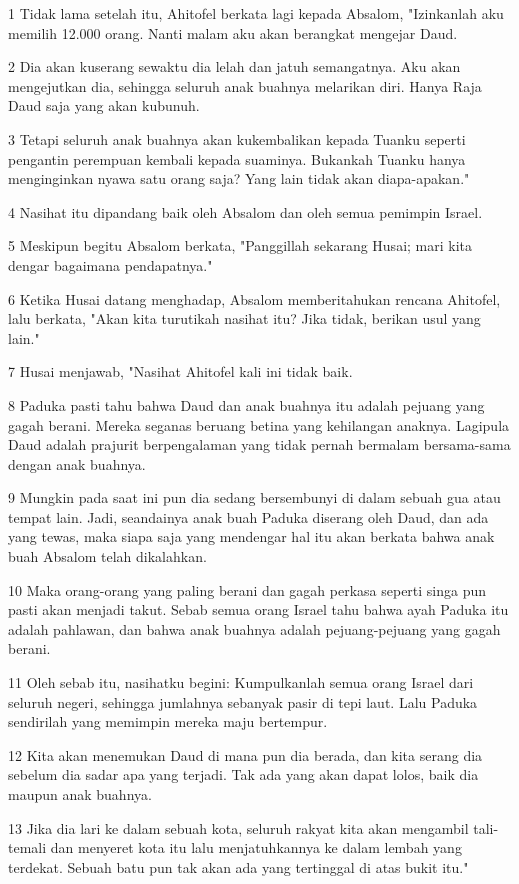 \par 1 Tidak lama setelah itu, Ahitofel berkata lagi kepada Absalom, "Izinkanlah aku memilih 12.000 orang. Nanti malam aku akan berangkat mengejar Daud.
\par 2 Dia akan kuserang sewaktu dia lelah dan jatuh semangatnya. Aku akan mengejutkan dia, sehingga seluruh anak buahnya melarikan diri. Hanya Raja Daud saja yang akan kubunuh.
\par 3 Tetapi seluruh anak buahnya akan kukembalikan kepada Tuanku seperti pengantin perempuan kembali kepada suaminya. Bukankah Tuanku hanya menginginkan nyawa satu orang saja? Yang lain tidak akan diapa-apakan."
\par 4 Nasihat itu dipandang baik oleh Absalom dan oleh semua pemimpin Israel.
\par 5 Meskipun begitu Absalom berkata, "Panggillah sekarang Husai; mari kita dengar bagaimana pendapatnya."
\par 6 Ketika Husai datang menghadap, Absalom memberitahukan rencana Ahitofel, lalu berkata, "Akan kita turutikah nasihat itu? Jika tidak, berikan usul yang lain."
\par 7 Husai menjawab, "Nasihat Ahitofel kali ini tidak baik.
\par 8 Paduka pasti tahu bahwa Daud dan anak buahnya itu adalah pejuang yang gagah berani. Mereka seganas beruang betina yang kehilangan anaknya. Lagipula Daud adalah prajurit berpengalaman yang tidak pernah bermalam bersama-sama dengan anak buahnya.
\par 9 Mungkin pada saat ini pun dia sedang bersembunyi di dalam sebuah gua atau tempat lain. Jadi, seandainya anak buah Paduka diserang oleh Daud, dan ada yang tewas, maka siapa saja yang mendengar hal itu akan berkata bahwa anak buah Absalom telah dikalahkan.
\par 10 Maka orang-orang yang paling berani dan gagah perkasa seperti singa pun pasti akan menjadi takut. Sebab semua orang Israel tahu bahwa ayah Paduka itu adalah pahlawan, dan bahwa anak buahnya adalah pejuang-pejuang yang gagah berani.
\par 11 Oleh sebab itu, nasihatku begini: Kumpulkanlah semua orang Israel dari seluruh negeri, sehingga jumlahnya sebanyak pasir di tepi laut. Lalu Paduka sendirilah yang memimpin mereka maju bertempur.
\par 12 Kita akan menemukan Daud di mana pun dia berada, dan kita serang dia sebelum dia sadar apa yang terjadi. Tak ada yang akan dapat lolos, baik dia maupun anak buahnya.
\par 13 Jika dia lari ke dalam sebuah kota, seluruh rakyat kita akan mengambil tali-temali dan menyeret kota itu lalu menjatuhkannya ke dalam lembah yang terdekat. Sebuah batu pun tak akan ada yang tertinggal di atas bukit itu."
